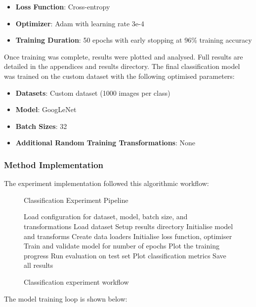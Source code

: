 \documentclass[conference]{IEEEtran}
\begin{document}
\begin{itemize}
    \item \textbf{Loss Function}: Cross-entropy
    \item \textbf{Optimizer}: Adam with learning rate 3e-4
    \item \textbf{Training Duration}: 50 epochs with early stopping at 96\% training accuracy 
\end{itemize}

Once training was complete, results were plotted and analysed. Full results are detailed in the appendices and results directory.
The final classification model was trained on the custom dataset with the following optimised parameters:

\begin{itemize}
  \item \textbf{Datasets}: Custom dataset (1000 images per class)
  \item \textbf{Model}: GoogLeNet
  \item \textbf{Batch Sizes}: 32
  \item \textbf{Additional Random Training Transformations}: None
\end{itemize}

\subsubsection{Method Implementation}

The experiment implementation followed this algorithmic workflow:

\begin{figure}[H]
\begin{algorithm}[H]
\caption{Classification Experiment Pipeline}
\begin{algorithmic}[1]
\STATE Load configuration for dataset, model, batch size, and transformations
    \STATE Load dataset
    \STATE Setup results directory
    \STATE Initialise model and transforms
    \STATE Create data loaders
    \STATE Initialise loss function, optimiser
    \STATE Train and validate model for number of epochs
    \STATE Plot the training progress
    \STATE Run evaluation on test set
    \STATE Plot classification metrics
    \STATE Save all results
\ENDFOR
\end{algorithmic}
\end{algorithm}
\caption{Classification experiment workflow}
\end{figure}

The model training loop is shown below:
\end{document}
